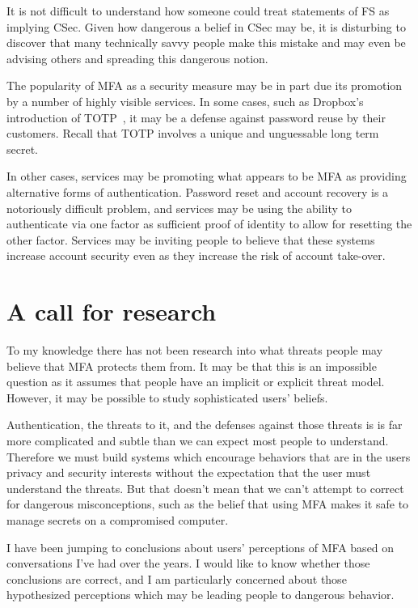 \documentclass{soups}
\begin{document}
It is not difficult to understand how someone could treat statements of FS as implying CSec.
Given how dangerous a belief in CSec may be, it is disturbing to discover that
many technically savvy people make this mistake and may even be advising others and spreading this dangerous notion.

The popularity of MFA as a security measure may be in part due its promotion by a number of highly visible services.
In some cases,
such as Dropbox's introduction of TOTP~\autocite{Dropbox12:reuse},
it may be a defense against password reuse by their customers.
Recall that TOTP involves a unique and unguessable long term secret.

In other cases, services may be promoting what appears to be MFA as providing
alternative forms of authentication. 
Password reset and account recovery is a notoriously difficult problem,
and services may be using the ability to authenticate via one factor
as sufficient proof of identity to allow for resetting the other factor.
Services may be inviting people to believe that these systems increase account security
even as they increase the risk of account take-over.

\section{A call for research}

To my knowledge there has not been research into what threats people may
believe that MFA protects them from.
It may be that this is an impossible question as it assumes that people
have an implicit or explicit threat model.
However, it may be possible to study sophisticated users' beliefs.

Authentication, the threats to it, and the defenses against those threats is 
is far more complicated and subtle than we can expect most people to understand.
Therefore we must build systems which encourage behaviors that are in the users
privacy and security interests without the expectation that the user must understand the threats.
But that doesn't mean that we can't attempt to correct for dangerous misconceptions,
such as the belief that using MFA makes it safe to manage secrets on a compromised computer.

I have been jumping to conclusions about users' perceptions of MFA based on 
conversations I've had over the years.
I would like to know whether those conclusions are correct,
and I am particularly concerned about those hypothesized perceptions which may be leading
people to dangerous behavior.

%
%
\printbibliography[title={REFERENCES},heading=bibnumbered]
\end{document}
